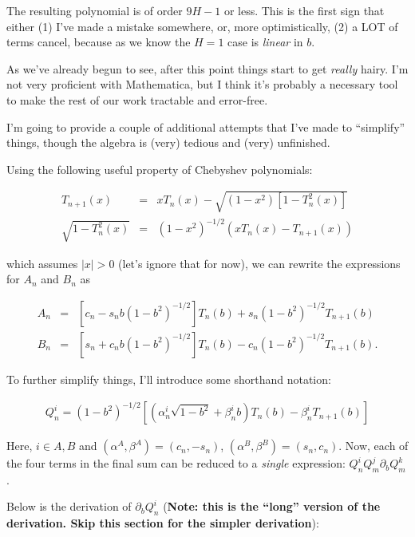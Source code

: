 The resulting polynomial is of order $9H - 1$ or less. This is the first sign that either (1) I've made a mistake somewhere, or, more
optimistically, (2) a LOT of terms cancel, because as we know the $H=1$ case is \emph{linear} in $b$.

As we've already begun to see, after this point things start to get \emph{really} hairy. I'm not very proficient with Mathematica, 
but I think it's probably a necessary tool to make the rest of our work tractable and error-free.

I'm going to provide a couple of additional attempts that I've made to ``simplify'' things, though the algebra is (very) tedious
and (very) unfinished.  

Using the following useful property of Chebyshev polynomials:

\begin{eqnarray}
T_{n+1}(x) &=& xT_n(x) - \sqrt{(1-x^2)\left[1-T_n^2(x)\right]}\\
\sqrt{1-T_n^2(x)} &=& (1-x^2)^{-1/2}\left(xT_n(x) - T_{n+1}(x)\right)
\end{eqnarray}

which assumes $|x|>0$ (let's ignore that for now), we can rewrite the expressions for $A_n$ and $B_n$ as 

\begin{eqnarray}
A_n &=& \left[c_n - s_nb(1-b^2)^{-1/2}\right]T_n(b) + s_n(1-b^2)^{-1/2}T_{n+1}(b) \\
B_n &=& \left[s_n + c_nb(1-b^2)^{-1/2}\right]T_n(b) - c_n(1-b^2)^{-1/2}T_{n+1}(b).
\end{eqnarray} 

To further simplify things, I'll introduce some shorthand notation:

\begin{eqnarray}
Q_n^i = (1-b^2)^{-1/2}\left[\left(\alpha_n^i\sqrt{1-b^2} + \beta_n^ib\right)T_n(b) - \beta_n^iT_{n+1}(b)\right]
\end{eqnarray}

Here, $i\in{A, B}$ and $(\alpha^A,\beta^A) = (c_n, -s_n)$, $(\alpha^B, \beta^B) = (s_n, c_n)$. Now, each of the four terms
in the final sum can be reduced to a \emph{single} expression: $Q_n^iQ_m^j\partial_bQ_m^k$. 

Below is the derivation of $\partial_bQ_n^i$ ({\bf Note: this is the ``long'' version of the derivation. Skip this section for the simpler derivation}):

